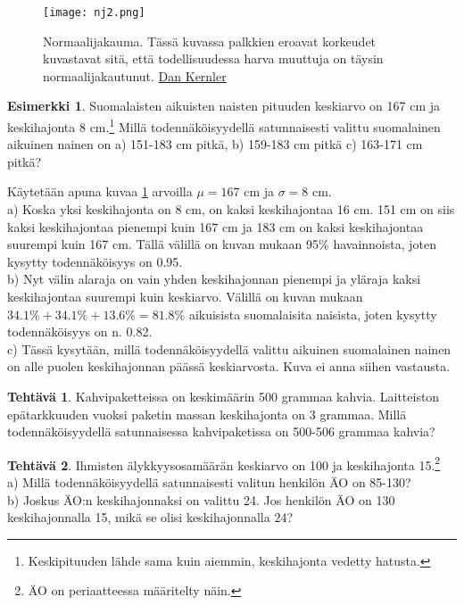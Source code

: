 \documentclass[12pt,leqno,a4paper,oneside]{amsart}
\theoremstyle{definition}
\newtheorem{example}[proclaim]{Esimerkki}
\newtheorem{exercise}{Tehtävä}
\theoremstyle{remark}
\numberwithin{equation}{section}
\begin{document}
\begin{figure}[H]
\begin{center}
\texttt{[image: nj2.png]}
\caption{Normaalijakauma. Tässä kuvassa palkkien eroavat korkeudet 
kuvastavat sitä, että todellisuudessa harva muuttuja on täysin normaalijakautunut.
\textcopyright \href{https://commons.wikimedia.org/wiki/File:Empirical_rule_histogram.svg}{Dan Kernler}}
\label{normaalijakauma2}
\end{center}
\end{figure}

\begin{example}
\label{naistenpituus}
Suomalaisten aikuisten naisten pituuden keskiarvo on 167 cm ja keskihajonta 8 cm.\footnote{Keskipituuden lähde sama kuin aiemmin, keskihajonta vedetty hatusta.}
Millä todennäköisyydellä satunnaisesti valittu suomalainen aikuinen nainen on a) 151-183 cm pitkä, b) 159-183 cm pitkä
c) 163-171 cm pitkä?

Käytetään apuna kuvaa \ref{normaalijakauma2} arvoilla $\mu=167$ cm ja $\sigma=8$ cm. \\
a) Koska yksi keskihajonta on 8 cm, on kaksi keskihajontaa 16 cm. 151 cm on siis kaksi keskihajontaa pienempi kuin 167 cm ja 183 cm on kaksi 
keskihajontaa suurempi kuin 167 cm. Tällä välillä on kuvan mukaan 95\% havainnoista, joten kysytty todennäköisyys on 0.95.\\
b) Nyt välin alaraja on vain yhden keskihajonnan pienempi ja yläraja kaksi keskihajontaa suurempi kuin keskiarvo. Välillä on kuvan mukaan
$34.1\% + 34.1\% + 13.6\% = 81.8\%$ aikuisista suomalaisita naisista, joten kysytty todennäköisyys on n. 0.82.\\
c) Tässä kysytään, millä todennäköisyydellä valittu aikuinen suomalainen nainen on alle puolen keskihajonnan päässä keskiarvosta. Kuva ei anna siihen
vastausta.
\end{example}

\begin{exercise}
Kahvipaketteissa on keskimäärin 500 grammaa kahvia. Laitteiston epätarkkuuden vuoksi paketin massan keskihajonta on 3 grammaa.
Millä todennäköisyydellä satunnaisessa kahvipaketissa on 500-506 grammaa kahvia?
\end{exercise}

\begin{exercise}
 Ihmisten älykkyysosamäärän keskiarvo on 100 ja keskihajonta 15.\footnote{ÄO on periaatteessa määritelty näin.}\\
 a) Millä todennäköisyydellä satunnaisesti valitun henkilön ÄO on 85-130?\\
 b) Joskus ÄO:n keskihajonnaksi on valittu 24. Jos henkilön ÄO on 130 keskihajonnalla 15, mikä se olisi keskihajonnalla 24?
\end{exercise}
\end{document}
